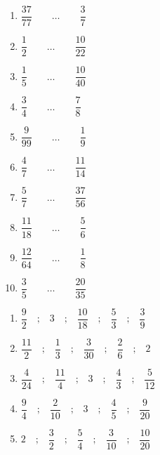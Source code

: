 \documentclass[9pt]{article}
\begin{document}
\begin{multicols}{2}
\begin{exercice}
\begin{enumerate}
	\item $\dfrac{37}{77}\quad\quad\ldots\quad\quad\dfrac{3}{7}$
	\item $\dfrac{1}{2}\quad\quad\ldots\quad\quad\dfrac{10}{22}$
	\item $\dfrac{1}{5}\quad\quad\ldots\quad\quad\dfrac{10}{40}$
	\item $\dfrac{3}{4}\quad\quad\ldots\quad\quad\dfrac{7}{8}$
	\item $\dfrac{9}{99}\quad\quad\ldots\quad\quad\dfrac{1}{9}$
	\item $\dfrac{4}{7}\quad\quad\ldots\quad\quad\dfrac{11}{14}$
	\item $\dfrac{5}{7}\quad\quad\ldots\quad\quad\dfrac{37}{56}$
	\item $\dfrac{11}{18}\quad\quad\ldots\quad\quad\dfrac{5}{6}$
	\item $\dfrac{12}{64}\quad\quad\ldots\quad\quad\dfrac{1}{8}$
	\item $\dfrac{3}{5}\quad\quad\ldots\quad\quad\dfrac{20}{35}$
\end{enumerate}
\end{exercice}

\newpage

\begin{exercice}
\begin{enumerate}
	\item $\dfrac{9}{2}\quad\text{;}\quad$$3\quad\text{;}\quad$$\dfrac{10}{18}\quad\text{;}\quad$$\dfrac{5}{3}\quad\text{;}\quad$$\dfrac{3}{9}$
	\item $\dfrac{11}{2}\quad\text{;}\quad$$\dfrac{1}{3}\quad\text{;}\quad$$\dfrac{3}{30}\quad\text{;}\quad$$\dfrac{2}{6}\quad\text{;}\quad$$2$
	\item $\dfrac{4}{24}\quad\text{;}\quad$$\dfrac{11}{4}\quad\text{;}\quad$$3\quad\text{;}\quad$$\dfrac{4}{3}\quad\text{;}\quad$$\dfrac{5}{12}$
	\item $\dfrac{9}{4}\quad\text{;}\quad$$\dfrac{2}{10}\quad\text{;}\quad$$3\quad\text{;}\quad$$\dfrac{4}{5}\quad\text{;}\quad$$\dfrac{9}{20}$
	\item $2\quad\text{;}\quad$$\dfrac{3}{2}\quad\text{;}\quad$$\dfrac{5}{4}\quad\text{;}\quad$$\dfrac{3}{10}\quad\text{;}\quad$$\dfrac{10}{20}$
\end{enumerate}
\end{exercice}


\end{multicols}
\end{document}
